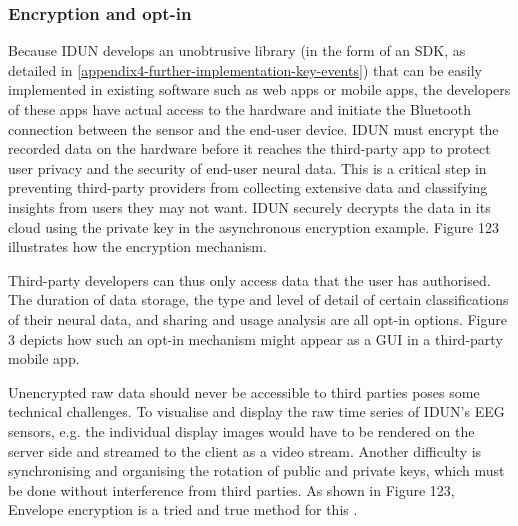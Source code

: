 
\subsubsection{Encryption and opt-in}
\label{chapter5-user-side-opt-in}

Because IDUN develops an unobtrusive library (in the form of an SDK, as detailed in \autoref{appendix4-further-implementation-key-events}) that can be easily implemented in existing software such as web apps or mobile apps, the developers of these apps have actual access to the hardware and initiate the Bluetooth connection between the sensor and the end-user device. IDUN must encrypt the recorded data on the hardware before it reaches the third-party app to protect user privacy and the security of end-user neural data. This is a critical step in preventing third-party providers from collecting extensive data and classifying insights from users they may not want. IDUN securely decrypts the data in its cloud using the private key in the asynchronous encryption example. Figure 123 illustrates how the encryption mechanism.


Third-party developers can thus only access data that the user has authorised. The duration of data storage, the type and level of detail of certain classifications of their neural data, and sharing and usage analysis are all opt-in options. Figure 3 depicts how such an opt-in mechanism might appear as a GUI in a third-party mobile app.


Unencrypted raw data should never be accessible to third parties poses some technical challenges. To visualise and display the raw time series of IDUN's EEG sensors, e.g. the individual display images would have to be rendered on the server side and streamed to the client as a video stream. Another difficulty is synchronising and organising the rotation of public and private keys, which must be done without interference from third parties. As shown in Figure 123, Envelope encryption is a tried and true method for this \citep{google_cloud_envelope_nodate}.


